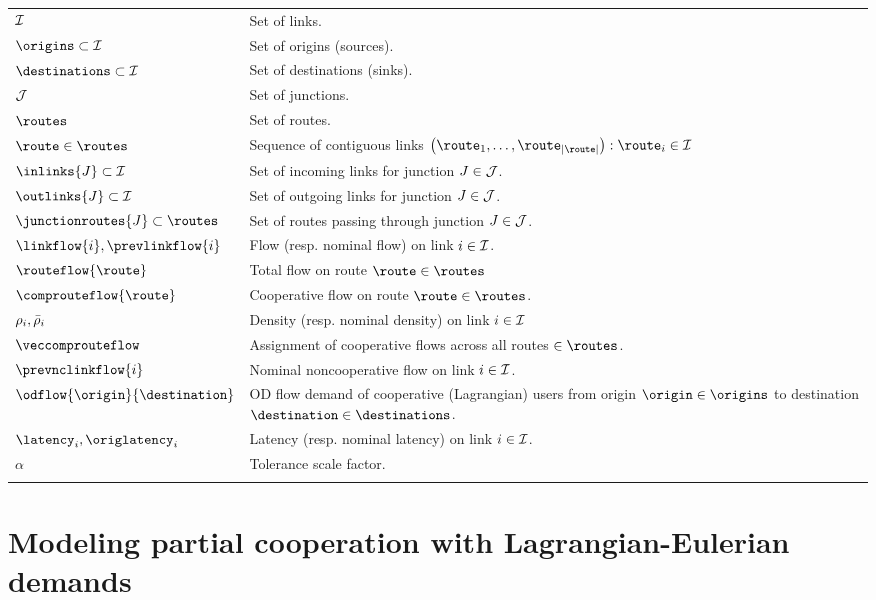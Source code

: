 \begin{longtable}{ll}
\label{tab:le:nomenclature}
$\mathcal{I}$ & Set of links.\tabularnewline
$\origins\subset\links$ & Set of origins (sources).\tabularnewline
$\destinations\subset\links$ & Set of destinations (sinks).\tabularnewline
$\mathcal{J}$ & Set of junctions.\tabularnewline
$\routes$ & Set of routes.\tabularnewline
$\route\in\routes$ & Sequence of contiguous links $\left(\route_{1},\ldots,\route_{\left|\route\right|}\right):\route_{i}\in\links$\tabularnewline
$\inlinks{\junction}\subset\links$ & Set of incoming links for junction $J\in\mathcal{J}$.\tabularnewline
$\outlinks{\junction}\subset\links$ & Set of outgoing links for junction $J\in\mathcal{J}$.\tabularnewline
$\junctionroutes{\junction}\subset\routes$ & Set of routes passing through junction $J\in\mathcal{J}$.\tabularnewline
$\linkflow{\link},\prevlinkflow{\link}$ & Flow (resp. nominal flow) on link $i\in\mathcal{I}$.\tabularnewline
$\routeflow{\route}$ & Total flow on route $\route\in\routes$\tabularnewline
$\comprouteflow{\route}$ & Cooperative flow on route $\route\in\routes$.\tabularnewline
$\rho_{i},\bar{\rho}_{i}$ & Density (resp. nominal density) on link $i\in\mathcal{I}$\tabularnewline
$\veccomprouteflow$ & Assignment of cooperative flows across all routes $\in\routes$.\tabularnewline
$\prevnclinkflow{\link}$ & Nominal noncooperative flow on link $i\in\mathcal{I}$.\tabularnewline
$\odflow{\origin}{\destination}$ & OD flow demand of cooperative (Lagrangian) users from origin $\origin\in\origins$
to destination $\destination\in\destinations$.\tabularnewline
$\latency_{\link},\origlatency_{\link}$ & Latency (resp. nominal latency) on link $i\in\mathcal{I}$.\tabularnewline
$\alpha$ & Tolerance scale factor.\tabularnewline
 & \tabularnewline
\end{longtable}



\section{Modeling partial cooperation with Lagrangian-Eulerian demands}
\label{sec:le:Modeling-Partial-Participance}

